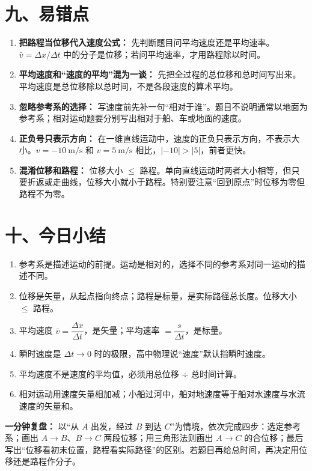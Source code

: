 \section*{九、易错点}

\begin{mistakebox}
\begin{enumerate}
  \item \textbf{把路程当位移代入速度公式：} 先判断题目问平均速度还是平均速率。$\bar v = \Delta x / \Delta t$ 中的分子是位移；若问平均速率，才用路程除以时间。

  \item \textbf{平均速度和“速度的平均”混为一谈：} 先把全过程的总位移和总时间写出来。平均速度是总位移除以总时间，不是各段速度的算术平均。

  \item \textbf{忽略参考系的选择：} 写速度前先补一句“相对于谁”。题目不说明通常以地面为参考系；相对运动题要分别写出相对于船、车或地面的速度。

  \item \textbf{正负号只表示方向：} 在一维直线运动中，速度的正负只表示方向，不表示大小。$v = -10\ \mathrm{m/s}$ 和 $v = 5\ \mathrm{m/s}$ 相比，$|-10| > |5|$，前者更快。

  \item \textbf{混淆位移和路程：} 位移大小 $\leq$ 路程。单向直线运动时两者大小相等，但只要折返或走曲线，位移大小就小于路程。特别要注意“回到原点”时位移为零但路程不为零。

\end{enumerate}
\end{mistakebox}

\section*{十、今日小结}

\begin{enumerate}
  \item 参考系是描述运动的前提。运动是相对的，选择不同的参考系对同一运动的描述不同。
  \item 位移是矢量，从起点指向终点；路程是标量，是实际路径总长度。位移大小 $\leq$ 路程。
  \item 平均速度 $\bar{v} = \dfrac{\Delta x}{\Delta t}$，是矢量；平均速率 $= \dfrac{s}{\Delta t}$，是标量。
  \item 瞬时速度是 $\Delta t \to 0$ 时的极限，高中物理说“速度”默认指瞬时速度。
  \item 平均速度不是速度的平均值，必须用总位移 ÷ 总时间计算。
  \item 相对运动用速度矢量相加减；小船过河中，船对地速度等于船对水速度与水流速度的矢量和。
\end{enumerate}

\textbf{一分钟复盘：} 以“从 $A$ 出发，经过 $B$ 到达 $C$”为情境，依次完成四步：选定参考系；画出 $A\to B$、$B\to C$ 两段位移；用三角形法则画出 $A\to C$ 的合位移；最后写出“位移看初末位置，路程看实际路径”的区别。若题目再给总时间，再决定用位移还是路程作分子。
